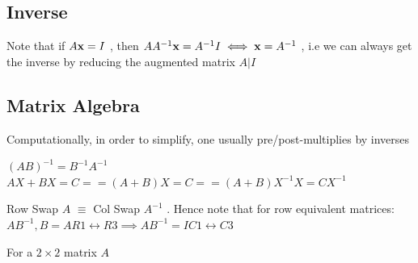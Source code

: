 \documentclass[english,course]{Notes}
\begin{document}

			
		\subsection{Inverse}
		
		
		
		\par{Note that if $A\mathbf{x} = I$ , then $AA^{-1}\mathbf{x} = A^{-1}I \iff \mathbf{x} = A^{-1}$ , i.e we can always get the inverse by reducing the augmented matrix $A | I$}
		
		
		\subsection{Matrix Algebra}
		
		\par{Computationally, in order to simplify, one usually pre/post-multiplies by inverses}
		
		
		$(AB)^{-1} = B^{-1}A^{-1}$
	       $AX + BX = C == (A + B)X = C == (A + B)X^{-1}X = CX^{-1}$ 
	       
	       \par{Row Swap $A$ $\equiv$ Col Swap $A^{-1}$ . Hence note that for row equivalent matrices: }
	       $A B^{-1} , B = A R1 \leftrightarrow R3 \implies A B^{-1} = I C1 \leftrightarrow C3$
	       
	      
	      \par{For a  $2 \times 2$ matrix $A$}
	      
\end{document}
